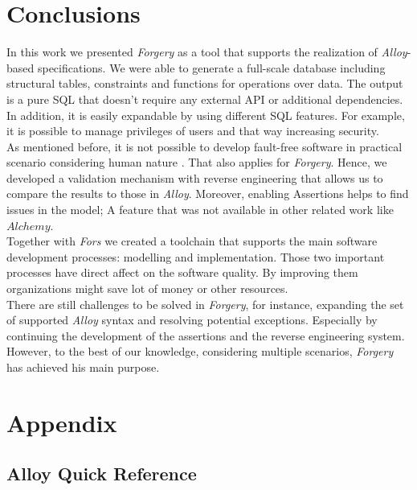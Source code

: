 \documentclass[oneside]{book}
\begin{document}
\newpage

\chapter{Conclusions}

In this work we presented \textit{Forgery} as a tool that supports the realization of \textit{Alloy}-based specifications. We were able to generate a full-scale database including structural tables, constraints and functions for operations over data. The output is a pure SQL that doesn't require any external API or additional dependencies. In addition, it is easily expandable by using different SQL features. For example, it is possible to manage privileges of users and that way increasing security.\\ 

As mentioned before, it is not possible to develop fault-free software in practical scenario considering human nature \cite{reliability}. That also applies for \textit{Forgery}. Hence, we developed a validation mechanism with reverse engineering that allows us to compare the results to those in \textit{Alloy}. Moreover, enabling Assertions helps to find issues in the model; A feature that was not available in other related work like $Alchemy$.\\

Together with \textit{Fors} we created a toolchain that supports the main software development processes: modelling and implementation. Those two important processes have direct affect on the software quality. By improving them organizations might save lot of money or other resources.\\

There are still challenges to be solved in \textit{Forgery}, for instance, expanding the set of supported \textit{Alloy} syntax and resolving potential exceptions. Especially by continuing the development of the assertions and the reverse engineering system. However, to the best of our knowledge, considering multiple scenarios, \textit{Forgery} has achieved his main purpose. 

\nocite{*}



\chapter{Appendix}
\section{Alloy Quick Reference}
\end{document}
